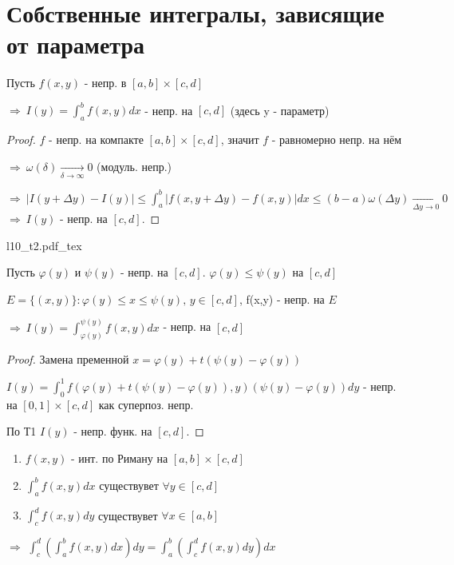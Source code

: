 \documentclass{article}
\newcommand{\incfig}[2][1]{%
    \def\svgwidth{#1\columnwidth}
    \hbox{{#2.pdf_tex}}
}
\theoremstyle{definition}
\numberwithin{theorem}{section}
\numberwithin{lemma}{section}
\numberwithin{definition}{section}
\numberwithin{corollary}{section}
\numberwithin{equation}{section}
\let\phi\varphi
\let\implies\Rightarrow
\begin{document}
\section{Собственные интегралы, зависящие от параметра}
\begin{theorem}[Т1]
  Пусть $f(x,y)$ - непр. в $[a,b]\times [c,d]$

  $\implies \ I(y)=\int_{a}^{b}f(x,y)dx$ - непр. на $[c,d]$ (здесь y - параметр)
\end{theorem}
\begin{proof}
  $f$ - непр. на компакте $[a,b]\times [c,d]$, значит $f$ - равномерно непр. на нём 

  $\implies \ \omega(\delta) \underset{\delta\to\infty}{\to}0$ (модуль. непр.)

  $\implies \ |I(y+\Delta y)-I(y)| \le \int_{a}^{b}|f(x,y+\Delta y)-f(x,y)|dx \le 
  (b-a)\omega(\Delta y) \underset{\Delta y \to 0}{\to} 0$
  $\implies \ I(y)$ - непр. на $[c,d]$.
\end{proof}
\incfig{l10_t2}
\begin{theorem}[Т2]
  Пусть $\phi(y)$ и $\psi(y)$ - непр. на $[c,d]$. $\phi(y) \le \psi(y)$ на $[c,d]$

  $E=\{(x,y)\}: \phi(y)\le x \le \psi(y), \, y\in [c,d]$, f(x,y) - непр. на $E$

  $\implies \ I(y)=\int_{\phi(y)}^{\psi(y)}f(x,y)dx$ - непр. на $[c,d]$
\end{theorem}
\begin{proof}
  Замена пременной $x=\phi(y)+t(\psi(y)-\phi(y))$

  $I(y)=\int_{0}^{1}f(\phi(y)+t(\psi(y)-\phi(y)), y)(\psi(y)-\phi(y))dy$ - непр. на $[0,1]\times [c,d]$ как суперпоз. непр.

  По Т1 $I(y)$ - непр. функ. на $[c,d]$.
\end{proof}
\begin{theorem}
  \phantom{.}

  \begin{enumerate}
  \item $f(x,y)$ - инт. по Риману на $[a,b]\times [c,d]$
  \item $\int_{a}^{b}f(x,y)dx$ существувет $\forall y \in [c,d]$
  \item $\int_{c}^{d}f(x,y)dy$ существувет $\forall x \in [a,b]$
  \end{enumerate}
  $\implies$ $\int_{c}^{d}(\int_{a}^{b}f(x,y)dx)dy=\int_{a}^{b}(\int_{c}^{d}f(x,y)dy)dx$
\end{theorem}
\end{document}
